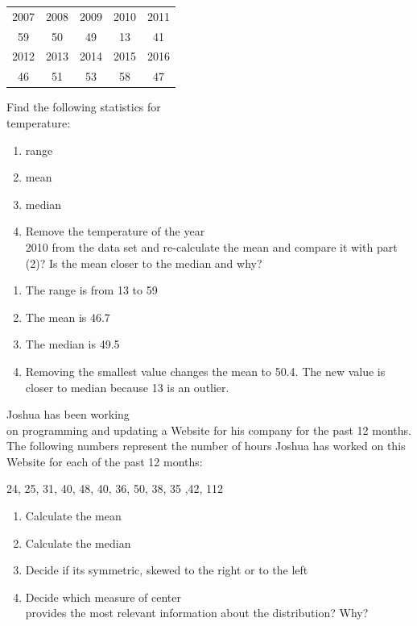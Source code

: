 \documentclass[11pt, chapterprefix=true]{scrbook}\usepackage[]{graphicx}\usepackage[]{color}
\begin{document}
\begin{exercises}
\begin{exercise}
\begin{tabular}{@{} ccccc @{}} \hline
2007 & 2008 & 2009 & 2010 & 2011 \\
59 & 50 & 49 & 13 & 41 \\ \hline
2012 & 2013 & 2014 & 2015 & 2016 \\
46 & 51 & 53 & 58 & 47 \\ \hline
\end{tabular}

Find the following statistics for \\ temperature:

\begin{enumerate}
\item range
\item mean
\item median
\item Remove the temperature of the year \\ 2010 from the data set and re-calculate the mean and compare it with part (2)? Is the mean closer to the median and why?
\end{enumerate}

   \end{exercise}
   \begin{solution} %



\begin{enumerate}
\item The range is from 13 to 59
\item The mean is 46.7
\item The median is 49.5
\item Removing the smallest value changes the mean to 50.4.  The new value is closer to median because 13 is an outlier.
\end{enumerate}
  \end{solution}

   \begin{exercise} %

Joshua has been working \\ on  programming  and updating a Website for his  company for the past 12 months. The following numbers represent the number of hours Joshua  has worked on this Website for each of the past 12 months:

24, 25, 31, 40, 48, 40, 36, 50, 38, 35 ,42, 112

\begin{enumerate}
\item Calculate the mean
\item Calculate the median
\item Decide if its symmetric, skewed to the right or to the left
\item Decide which measure of center \\ provides the most relevant information about the distribution? Why?
\end{enumerate}


\end{exercise}
\end{exercises}
\end{document}
